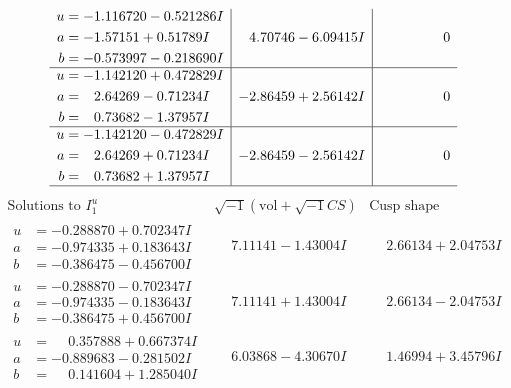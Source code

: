 \documentclass[1p]{elsarticle_modified}
\theoremstyle{definition}
\newcommand{\I}{\sqrt{-1}}
\begin{document}
$$\begin{array}{c|c|c}
\begin{aligned}
u &= -1.116720 - 0.521286 I \\
a &= -1.57151 + 0.51789 I \\
b &= -0.573997 - 0.218690 I\end{aligned}
 & \phantom{-}4.70746 - 6.09415 I & \phantom{-0.000000 } 0 \\ \hline\begin{aligned}
u &= -1.142120 + 0.472829 I \\
a &= \phantom{-}2.64269 - 0.71234 I \\
b &= \phantom{-}0.73682 - 1.37957 I\end{aligned}
 & -2.86459 + 2.56142 I & \phantom{-0.000000 } 0 \\ \hline\begin{aligned}
u &= -1.142120 - 0.472829 I \\
a &= \phantom{-}2.64269 + 0.71234 I \\
b &= \phantom{-}0.73682 + 1.37957 I\end{aligned}
 & -2.86459 - 2.56142 I & \phantom{-0.000000 } 0\\
 \hline 
 \end{array}$$\newpage$$\begin{array}{c|c|c}  
\text{Solutions to }I^u_{1}& \I (\text{vol} + \sqrt{-1}CS) & \text{Cusp shape}\\
 \hline 
\begin{aligned}
u &= -0.288870 + 0.702347 I \\
a &= -0.974335 + 0.183643 I \\
b &= -0.386475 - 0.456700 I\end{aligned}
 & \phantom{-}7.11141 - 1.43004 I & \phantom{-}2.66134 + 2.04753 I \\ \hline\begin{aligned}
u &= -0.288870 - 0.702347 I \\
a &= -0.974335 - 0.183643 I \\
b &= -0.386475 + 0.456700 I\end{aligned}
 & \phantom{-}7.11141 + 1.43004 I & \phantom{-}2.66134 - 2.04753 I \\ \hline\begin{aligned}
u &= \phantom{-}0.357888 + 0.667374 I \\
a &= -0.889683 - 0.281502 I \\
b &= \phantom{-}0.141604 + 1.285040 I\end{aligned}
 & \phantom{-}6.03868 - 4.30670 I & \phantom{-}1.46994 + 3.45796 I \\ \hline\begin{aligned}

\end{aligned}
\end{array}$$
\end{document}
